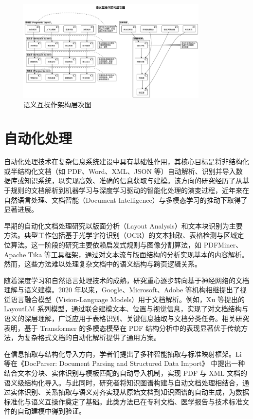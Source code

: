 \begin{figure}[H]
    \centering
    \includegraphics[width=0.85\textwidth,height=0.7\textheight,keepaspectratio]{chapters/fig-0/semantic_interop_architecture.png}
    \caption{语义互操作架构层次图}
    \label{fig_semantic_interop_architecture}
\end{figure}


\section{自动化处理}

自动化处理技术在复杂信息系统建设中具有基础性作用，其核心目标是将非结构化或半结构化文档（如 PDF、Word、XML、JSON 等）自动解析、识别并导入数据库或知识系统，以实现高效、准确的信息获取与建模。该方向的研究经历了从基于规则的文档解析到机器学习与深度学习驱动的智能化处理的演变过程，近年来在自然语言处理、文档智能（Document Intelligence）与多模态学习的推动下取得了显著进展。

早期的自动化文档处理研究以版面分析（Layout Analysis）和文本块识别为主要方法。典型工作包括基于光学字符识别（OCR）的文本抽取、表格检测与区域定位算法。这一阶段的研究主要依赖启发式规则与图像分割算法，如 PDFMiner、Apache Tika 等工具框架，通过对文本流与版面结构的分析实现基本的内容解析。然而，这些方法难以处理复杂文档中的语义结构与跨页逻辑关系。

随着深度学习和自然语言处理技术的成熟，研究重心逐步转向基于神经网络的文档理解与语义建模。2020 年以来，Google、Microsoft、Adobe 等机构相继提出了视觉语言融合模型（Vision-Language Models）用于文档解析。例如，Xu 等提出的 LayoutLM 系列模型\cite{Xu2020LayoutLM,Xu2022LayoutLMv3}，通过联合建模文本、位置与视觉信息，实现了对文档结构与语义的深层理解，广泛应用于表格识别、关键信息抽取与文档分类任务。相关研究表明，基于 Transformer 的多模态模型在 PDF 结构分析中的表现显著优于传统方法，为复杂格式文档的自动化解析提供了通用方案。

在信息抽取与结构化导入方向，学者们提出了多种智能抽取与标准映射框架。Li 等在《DocParser: Document Parsing and Structured Data Import》\cite{Li2021DocParser} 中提出一种结合文本分块、实体识别与模板匹配的自动导入机制，实现 PDF 与 XML 文档的语义级结构化导入。与此同时，研究者将知识图谱构建与自动文档处理相结合，通过实体识别、关系抽取与语义对齐实现从原始文档到知识图谱的自动生成，为数据标准化与语义互操作奠定了基础。此类方法已在专利文档、医学报告与技术标准文件的自动建模中得到验证。

